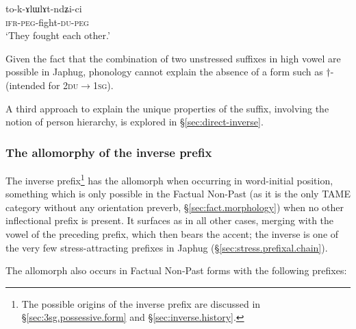 \begin{exe}
\ex \label{ex:tokAlWlAtndZici}
\gll to-k-ɤlɯlɤt-ndʑi-ci \\
\textsc{ifr}-\textsc{peg}-fight-\textsc{du}-\textsc{peg} \\
\glt `They fought each other.'
\end{exe}

Given the fact that the combination of two unstressed suffixes in high vowel are possible in Japhug, phonology cannot explain the absence of a form such as $\dagger$\siga{}- (intended for \textsc{2du$\rightarrow$1sg}).

A third approach to explain the unique properties of the  suffix, involving the notion of person hierarchy, is explored in §\ref{sec:direct-inverse}.

\subsubsection{The allomorphy of the inverse prefix} \label{sec:allomorphy.inv}
The inverse prefix\footnote{The possible origins of the inverse prefix are discussed in §\ref{sec:3sg.possessive.form} and §\ref{sec:inverse.history}.} has the allomorph  when occurring in word-initial position, something which is only possible in the Factual Non-Past (as it is the only TAME category without any orientation preverb, §\ref{sec:fact.morphology}) when no other inflectional prefix is present. It surfaces as  in all other cases, merging with the vowel of the preceding prefix, which then bears the accent; the inverse is one of the very few stress-attracting prefixes in Japhug (§\ref{sec:stress.prefixal.chain}).

The allomorph  also occurs in Factual Non-Past forms with the following prefixes:

